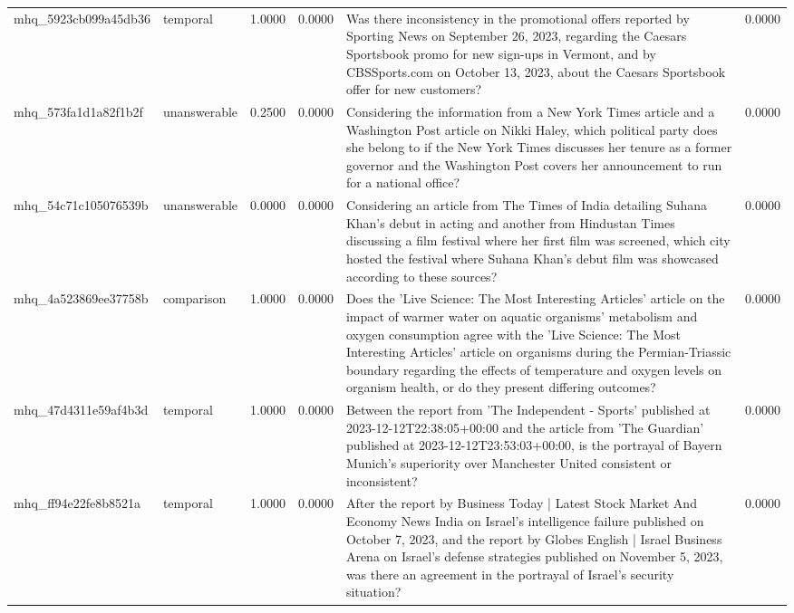 \begin{tabular}{llrrlr}
mhq_5923cb099a45db36 & temporal & 1.0000 & 0.0000 & Was there inconsistency in the promotional offers reported by Sporting News on September 26, 2023, regarding the Caesars Sportsbook promo for new sign-ups in Vermont, and by CBSSports.com on October 13, 2023, about the Caesars Sportsbook offer for new customers? & 0.0000 \\
mhq_573fa1d1a82f1b2f & unanswerable & 0.2500 & 0.0000 & Considering the information from a New York Times article and a Washington Post article on Nikki Haley, which political party does she belong to if the New York Times discusses her tenure as a former governor and the Washington Post covers her announcement to run for a national office? & 0.0000 \\
mhq_54c71c105076539b & unanswerable & 0.0000 & 0.0000 & Considering an article from The Times of India detailing Suhana Khan's debut in acting and another from Hindustan Times discussing a film festival where her first film was screened, which city hosted the festival where Suhana Khan's debut film was showcased according to these sources? & 0.0000 \\
mhq_4a523869ee37758b & comparison & 1.0000 & 0.0000 & Does the 'Live Science: The Most Interesting Articles' article on the impact of warmer water on aquatic organisms' metabolism and oxygen consumption agree with the 'Live Science: The Most Interesting Articles' article on organisms during the Permian-Triassic boundary regarding the effects of temperature and oxygen levels on organism health, or do they present differing outcomes? & 0.0000 \\
mhq_47d4311e59af4b3d & temporal & 1.0000 & 0.0000 & Between the report from 'The Independent - Sports' published at 2023-12-12T22:38:05+00:00 and the article from 'The Guardian' published at 2023-12-12T23:53:03+00:00, is the portrayal of Bayern Munich's superiority over Manchester United consistent or inconsistent? & 0.0000 \\
mhq_ff94e22fe8b8521a & temporal & 1.0000 & 0.0000 & After the report by Business Today | Latest Stock Market And Economy News India on Israel's intelligence failure published on October 7, 2023, and the report by Globes English | Israel Business Arena on Israel's defense strategies published on November 5, 2023, was there an agreement in the portrayal of Israel's security situation? & 0.0000 \\
\bottomrule
\end{tabular}
